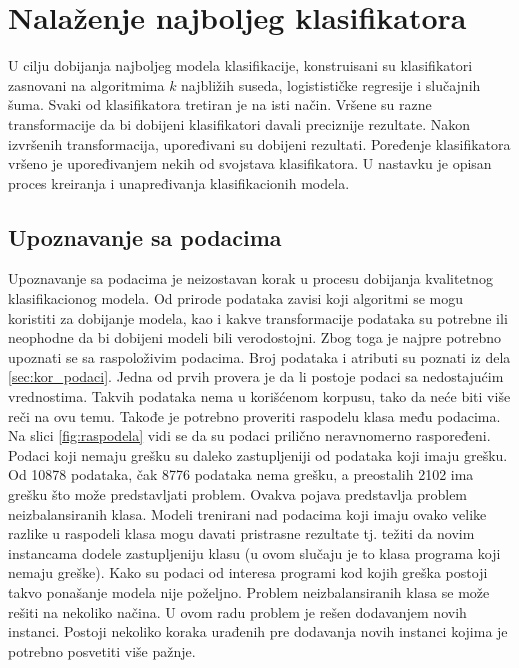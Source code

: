 \documentclass[12pt,oneside]{memoir}
\begin{document}
\section{Nalaženje najboljeg klasifikatora}
\label{sec:obuka}

U cilju dobijanja najboljeg modela klasifikacije, konstruisani su klasifikatori zasnovani na algoritmima $k$ najbližih suseda, logistističke regresije i slučajnih šuma. Svaki od klasifikatora tretiran je na isti način. Vršene su razne transformacije da bi dobijeni klasifikatori davali preciznije rezultate. Nakon izvršenih transformacija, upoređivani su dobijeni rezultati. Poređenje klasifikatora vršeno je upoređivanjem nekih od svojstava klasifikatora. U nastavku je opisan proces kreiranja i unapređivanja klasifikacionih modela.  




\subsection{Upoznavanje sa podacima}  \label{sec:upoznavanje}


Upoznavanje sa podacima je neizostavan korak u procesu dobijanja kvalitetnog klasifikacionog modela. Od prirode podataka zavisi koji algoritmi se mogu koristiti za dobijanje modela, kao i kakve transformacije podataka su potrebne ili neophodne da bi dobijeni modeli bili verodostojni.
Zbog toga je najpre potrebno upoznati se sa raspoloživim podacima. Broj podataka i atributi su poznati iz dela \ref{sec:kor_podaci}. Jedna od prvih provera je da li postoje podaci sa nedostajućim vrednostima. Takvih podataka nema u korišćenom korpusu, tako da neće biti više reči na ovu temu. Takođe je potrebno proveriti raspodelu klasa među podacima. Na slici \ref{fig:raspodela} vidi se da su podaci prilično neravnomerno raspoređeni. Podaci koji nemaju grešku su daleko zastupljeniji od podataka koji imaju grešku. Od 10878 podataka, čak 8776 podataka nema grešku, a preostalih 2102 ima grešku što može predstavljati problem. Ovakva pojava predstavlja problem neizbalansiranih klasa. Modeli trenirani nad podacima koji imaju ovako velike razlike u raspodeli klasa mogu davati pristrasne rezultate tj. težiti da novim instancama dodele zastupljeniju klasu (u ovom slučaju je to klasa programa koji nemaju greške). Kako su podaci od interesa programi kod kojih greška postoji takvo ponašanje modela nije poželjno. Problem neizbalansiranih klasa se može rešiti na nekoliko načina. U ovom radu problem je rešen dodavanjem novih instanci. Postoji nekoliko koraka urađenih pre dodavanja novih instanci kojima je potrebno posvetiti više pažnje.  
\end{document}
